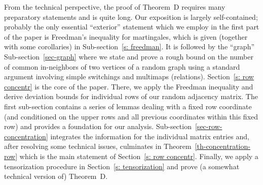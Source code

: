 \documentclass[12pt]{article}
\theoremstyle{definition}
\theoremstyle{plain}
\begin{document}
From the technical perspective, the proof of Theorem~D requires many preparatory statements
and is quite long. Our exposition is largely self-contained; probably the only essential ``exterior''
statement which we employ in the first part of the paper is Freedman's inequality for martingales,
which is given (together with some corollaries) in Sub-section~\ref{s: freedman}.
It is followed by the ``graph'' Sub-section~\ref{sec-graph} where we state
and prove a rough bound on the number of common in-neighbors of two vertices of
a random graph using a standard argument involving simple switchings and multimaps (relations).
Section~\ref{s: row concentr} is the core of the paper. There, we apply the Freedman inequality
and derive deviation bounds for individual rows of our random adjacency matrix.
The first sub-section contains a series of lemmas dealing with a fixed
row coordinate (and conditioned on the upper rows and all previous
coordinates within this fixed row) and provides a foundation for our analysis.
Sub-section~\ref{sec-row-concentration} integrates the information for the individual matrix entries
and, after resolving some technical issues, culminates in Theorem~\ref{th-concentration-row}
which is the main statement of Section~\ref{s: row concentr}.
Finally, we apply a tensorization procedure in Section~\ref{s: tensorization}
and prove (a somewhat technical version of) Theorem~D.


\medskip 
\end{document}
